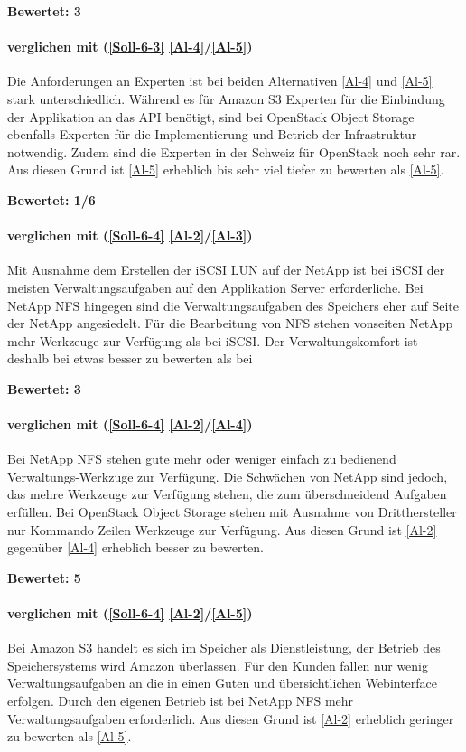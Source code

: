 \textbf{Bewertet: 3}


\paragraph*{  verglichen mit  (\ref{Soll-6-3} \ref{Al-4}/\ref{Al-5})}
Die Anforderungen an Experten ist bei beiden Alternativen \ref{Al-4} und \ref{Al-5} stark unterschiedlich. Während es für Amazon S3 Experten für die Einbindung der Applikation an das API benötigt, sind bei OpenStack Object Storage ebenfalls Experten für die Implementierung und Betrieb der Infrastruktur notwendig. Zudem sind die Experten in der Schweiz für OpenStack noch sehr rar. Aus diesen Grund ist \ref{Al-5} erheblich bis sehr viel tiefer zu bewerten als \ref{Al-5}.

\textbf{Bewertet: 1/6}

\paragraph*{  verglichen mit  (\ref{Soll-6-4} \ref{Al-2}/\ref{Al-3})}
Mit Ausnahme dem Erstellen der iSCSI LUN auf der NetApp ist bei iSCSI der meisten Verwaltungsaufgaben auf den Applikation Server erforderliche. Bei NetApp NFS hingegen sind die Verwaltungsaufgaben des Speichers eher auf Seite der NetApp angesiedelt. Für die Bearbeitung von NFS stehen vonseiten NetApp mehr Werkzeuge zur Verfügung als bei iSCSI. Der Verwaltungskomfort ist deshalb bei  etwas besser zu bewerten als bei 

\textbf{Bewertet: 3}

\paragraph*{  verglichen mit  (\ref{Soll-6-4} \ref{Al-2}/\ref{Al-4})}
Bei NetApp NFS stehen gute mehr oder weniger einfach zu bedienend Verwaltungs-Werkzuge zur Verfügung. Die Schwächen von NetApp sind jedoch, das mehre Werkzeuge zur Verfügung stehen, die zum überschneidend Aufgaben erfüllen. Bei OpenStack Object Storage stehen mit Ausnahme von Dritthersteller nur Kommando Zeilen Werkzeuge zur Verfügung. 
Aus diesen Grund ist  \ref{Al-2} gegenüber  \ref{Al-4} erheblich besser zu bewerten.
 
\textbf{Bewertet: 5}

\paragraph*{  verglichen mit  (\ref{Soll-6-4} \ref{Al-2}/\ref{Al-5})}
Bei Amazon S3 handelt es sich im Speicher als Dienstleistung, der Betrieb des Speichersystems wird Amazon überlassen. Für den Kunden fallen nur wenig Verwaltungsaufgaben an die in einen Guten und übersichtlichen Webinterface erfolgen. Durch den eigenen Betrieb ist bei NetApp NFS mehr Verwaltungsaufgaben erforderlich. Aus diesen Grund ist  \ref{Al-2} erheblich geringer zu bewerten als  \ref{Al-5}.


